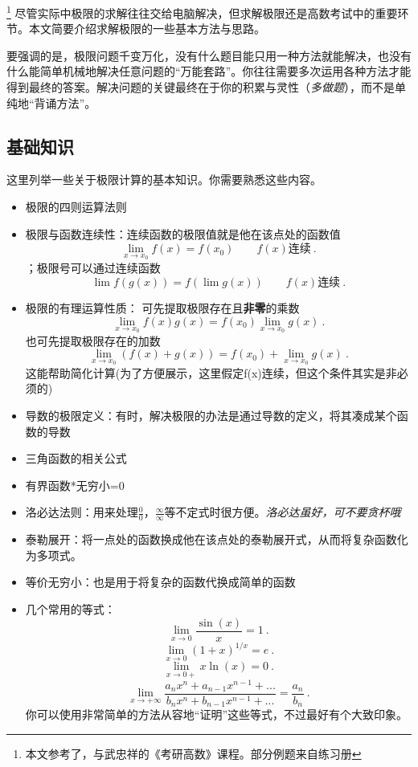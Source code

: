 
\begin{issues}
\issueDraft
\end{issues}
\footnote{本文参考了\cite{同济高}，\cite{Thomas}与武忠祥的《考研高数》课程。部分例题来自练习册}
尽管实际中极限的求解往往交给电脑解决，但求解极限还是高数考试中的重要环节。本文简要介绍求解极限的一些基本方法与思路。

要强调的是，极限问题千变万化，没有什么题目能只用一种方法就能解决，也没有什么能简单机械地解决任意问题的“万能套路”。你往往需要多次运用各种方法才能得到最终的答案。解决问题的关键最终在于你的积累与灵性（\textsl{多做题}），而不是单纯地“背诵方法”。

\subsection{基础知识}
这里列举一些关于极限计算的基本知识。你需要熟悉这些内容。
\begin{itemize}
\item 极限的四则运算法则
\item 极限与函数连续性：连续函数的极限值就是他在该点处的函数值$$\lim _{x \to x_0}f(x) = f(x_0) \qquad f(x)\text{连续}~.$$；极限号可以通过连续函数 $$\lim f(g(x)) = f(\lim g(x)) \qquad f(x)\text{连续}~.$$
\item 极限的有理运算性质：
可先提取极限存在且\textbf{非零}的乘数 
$$\lim_{x\to x_0} f(x)g(x) = f(x_0)\lim_{x\to x_0} g(x)~.$$
也可先提取极限存在的加数
$$\lim_{x\to x_0} (f(x)+g(x)) = f(x_0)+\lim_{x\to x_0} g(x)~.$$
这能帮助简化计算(为了方便展示，这里假定f(x)连续，但这个条件其实是非必须的)
\item 导数的极限定义：有时，解决极限的办法是通过导数的定义，将其凑成某个函数的导数
\item 三角函数的相关公式
\item 有界函数*无穷小=0
\item 洛必达法则：用来处理$\frac{0}{0}$，$\frac{\infty}{\infty}$等不定式时很方便。\textsl{洛必达虽好，可不要贪杯哦}
\item 泰勒展开：将一点处的函数换成他在该点处的泰勒展开式，从而将复杂函数化为多项式。
\item 等价无穷小：也是用于将复杂的函数代换成简单的函数
\item 几个常用的等式：
$$\lim_{x\to0} \frac{\sin(x)}{x}=1~.$$
$$\lim_{x\to0} (1+x)^{1/x}=e~.$$
$$\lim_{x\to0+} x\ln(x)=0~.$$
$$\lim_{x\to+\infty} \frac{a_nx^n+a_{n-1}x^{n-1}+...}{b_nx^n+b_{n-1}x^{n-1}+...}=\frac{a_n}{b_n}~.$$
你可以使用非常简单的方法从容地“证明”这些等式，不过最好有个大致印象。
\end{itemize}

